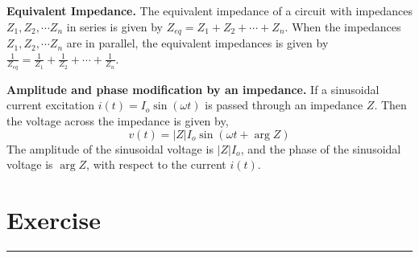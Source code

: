 \noindent\textbf{Equivalent Impedance.} The equivalent impedance of a circuit with impedances $Z_1, Z_2, \cdots Z_n$ in series is given by $Z_{eq} = Z_1 + Z_2 + \cdots + Z_n$. When the impedances $Z_1, Z_2, \cdots Z_n$ are in parallel, the equivalent impedances is given by $\frac{1}{Z_{eq}} = \frac{1}{Z_1} + \frac{1}{Z_2} + \cdots + \frac{1}{Z_n}$.

\noindent\textbf{Amplitude and phase modification by an impedance.} If a sinusoidal current excitation $i\left(t\right) = I_o \sin\left(\omega t\right)$ is passed through an impedance $Z$. Then the voltage across the impedance is given by,
\begin{equation}
    v\left(t\right) = \vert Z \vert I_o \sin\left(\omega t + \arg Z \right)
    \label{eq:02-36}
\end{equation}
The amplitude of the sinusoidal voltage is $\vert Z \vert I_o$, and the phase of the sinusoidal voltage is $\arg Z$, with respect to the current $i\left(t\right)$. 

\section{Exercise}
\vspace{-0.5cm}
\begin{center}
    \rule{\textwidth}{1pt}
\end{center}

